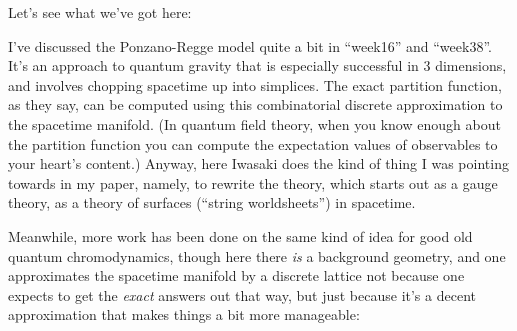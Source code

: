 \documentclass{article}
\def\tightlist{}
\renewcommand{\texttt}[1]{%
  \begingroup
  \ttfamily
  \begingroup\lccode`~=`/\lowercase{\endgroup\def~}{/\discretionary{}{}{}}%
  \begingroup\lccode`~=`[\lowercase{\endgroup\def~}{[\discretionary{}{}{}}%
  \begingroup\lccode`~=`.\lowercase{\endgroup\def~}{.\discretionary{}{}{}}%
  \catcode`/=\active\catcode`[=\active\catcode`.=\active
  \scantokens{#1\noexpand}%
  \endgroup
}
\begin{document}
Let's see what we've got here:


I've discussed the Ponzano-Regge model quite a bit in ``week16'' and
``week38''. It's an approach to quantum gravity that is especially
successful in 3 dimensions, and involves chopping spacetime up into
simplices. The exact partition function, as they say, can be computed
using this combinatorial discrete approximation to the spacetime
manifold. (In quantum field theory, when you know enough about the
partition function you can compute the expectation values of observables
to your heart's content.) Anyway, here Iwasaki does the kind of thing I
was pointing towards in my paper, namely, to rewrite the theory, which
starts out as a gauge theory, as a theory of surfaces (``string
worldsheets'') in spacetime.

Meanwhile, more work has been done on the same kind of idea for good old
quantum chromodynamics, though here there \emph{is} a background
geometry, and one approximates the spacetime manifold by a discrete
lattice not because one expects to get the \emph{exact} answers out that
way, but just because it's a decent approximation that makes things a
bit more manageable:

\end{document}
